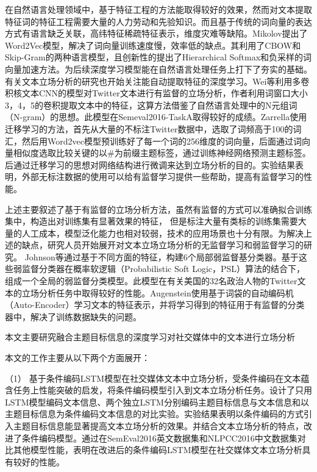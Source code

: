 在自然语言处理领域中，基于特征工程的方法能取得较好的效果，然而对文本提取特征词的特征工程需要大量的人力劳动和先验知识。而且基于传统的词向量的表达方式有语言缺乏关联，高纬特征稀疏特征表示，维度灾难等缺陷。Mikolov提出了Word2Vec模型，解决了词向量训练速度慢，效率低的缺点。其利用了CBOW和Skip-Gram的两种语言模型，且创新性的提出了Hierarchical Softmax和负采样的词向量加速方法。为后续深度学习模型能在自然语言处理任务上打下了夯实的基础。有关文本立场分析的研究也开始关注能自动提取特征的深度学习。Wei\cite{wei2016pkudblab}等利用多卷积核文本CNN的模型对Twitter文本进行有监督的立场分析，作者利用词窗口大小3，4，5的卷积提取文本中的特征，这算方法借鉴了自然语言处理中的N元组词（N-gram）的思想。此模型在Semeval2016-TaskA取得较好的成绩。Zarrella使用迁移学习的方法，首先从大量的不标注Twitter数据中，选取了词频高于100的词汇，然后用Word2vec模型预训练好了每一个词的256维度的词向量，后面通过词向量相似度选取比较关键的以\#为前缀主题标签，通过训练神经网络预测主题标签。后通过迁移学习的思想对网络结构进行微调来达到立场分析的目的。实验结果表明，外部无标注数据的使用可以给有监督学习提供一些帮助，提高有监督学习的性能。

上述主要叙述了基于有监督的立场分析方法，虽然有监督的方式可以准确拟合训练集中，构造出对训练集有显著效果的特征， 但是标注大量有类标的训练集需要大量的人工成本，模型泛化能力也相对较弱，技术的应用场景也十分有限。为解决上述的缺点，研究人员开始展开对文本立场立场分析的无监督学习和弱监督学习的研究。 Johnson等通过基于不同方面的特征，构建6个局部弱监督基分类器。基于这些弱监督分类器在概率软逻辑（Probabilistic Soft Logic，PSL）算法的结合下，组成一个全局的弱监督分类模型。此模型在有关美国的32名政治人物的Twitter文本的立场分析任务中取得较好的性能。Augenstein使用基于词袋的自动编码机（Auto-Encoder）学习文本的特征表示，并将学习得到的特征用于有监督的分类器中，解决了训练数据缺失的问题。




本文主要研究融合主题目标信息的深度学习对社交媒体中的文本进行立场分析

本文的工作主要从以下两个方面展开：

（1） 基于条件编码LSTM模型在社交媒体文本中立场分析，受条件编码在文本蕴含任务上性能突破的启发，将条件编码模型引入到文本立场分析任务。设计了只用LSTM模型编码文本信息、两个独立LSTM分别编码主题目标信息与文本信息和以主题目标信息为条件编码文本信息的对比实验。实验结果表明以条件编码的方式引入主题目标信息能显著提高文本立场分析的效果。并结合文本立场分析的特点，改进了条件编码模型。通过在SemEval2016英文数据集和NLPCC2016中文数据集对比其他模型性能，表明在改进后的条件编码LSTM模型在社交媒体文本立场分析具有较好的性能。

